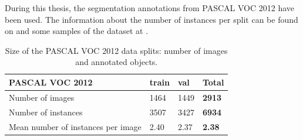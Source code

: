 During this thesis, the segmentation annotations from PASCAL VOC 2012 have been used. The information about the number of instances per split can be found on  and some samples of the dataset at .

\begin{table}[h]
\centering
\begin{tabular}{l|lll}
PASCAL VOC 2012                    & train & val  & \textbf{Total} \\
\hline
Number of images                & 1464    & 1449   & \textbf{2913}    \\
Number of instances           & 3507 & 3427 & \textbf{6934} \\
Mean number of instances per image & 2.40  & 2.37 & \textbf{2.38}  \\
\end{tabular}
\caption{Size of the PASCAL VOC 2012 data splits: number of images and annotated objects.}
\label{tab:pascal}
\end{table}


